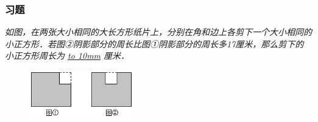 \begin{frame}
    \frametitle{习题\theframecounter}
    \vspace*{-1cm}
    \textit{如图，在两张大小相同的大长方形纸片上，分别在角和边上各剪下一个大小相同的小正方形．若图②阴影部分的周长比图①阴影部分的周长多17厘米，那么剪下的小正方形周长为 \underline{\hbox to 10mm{}} 厘米．} \\
    \begin{figure}[H] 
        \centering
        \includegraphics[width=0.4\textwidth]{./pics/Chapter_3/15.png}
    \end{figure}
\end{frame}